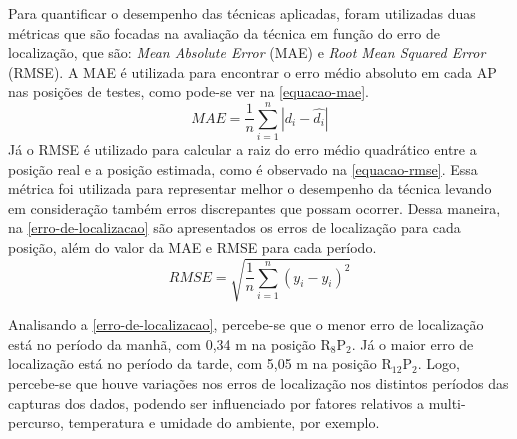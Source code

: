 \documentclass[12pt]{artigoifce}
\begin{document}
\renewcommand{\figureautorefname}{Figura}%
\newpage
Para quantificar o desempenho das técnicas aplicadas, foram utilizadas duas métricas que são focadas na avaliação da técnica em função do erro de localização, que são: \textit{Mean Absolute Error} (MAE) e \textit{Root Mean Squared Error} (RMSE). A MAE é utilizada para encontrar o erro médio absoluto em cada AP nas posições de testes, como pode-se ver na \autoref{equacao-mae}. 
\begin{equation}
	\label{equacao-mae}
	MAE = \frac{1}{n}\sum_{i=1}^{n} \left|d_i-\hat{d_i}\right|
\end{equation}
Já o RMSE é utilizado para calcular a raiz do  erro  médio quadrático entre a posição real e a posição estimada, como é observado na \autoref{equacao-rmse}. Essa métrica foi utilizada para representar melhor o desempenho da técnica levando em consideração também erros discrepantes que possam ocorrer. Dessa maneira, na \autoref{erro-de-localizacao} são apresentados os erros de localização para cada posição, além do valor da MAE e RMSE para cada período.
\begin{equation}
	\label{equacao-rmse}
	RMSE = \sqrt{\frac{1}{n}\sum_{i=1}^{n} \left(y_i-\hat{y_i}\right)^2}
\end{equation}

Analisando a \autoref{erro-de-localizacao}, percebe-se que o menor erro de localização está no período da manhã, com 0,34 m na posição R$_\text{8}$P$_\text{2}$. Já o maior erro de localização está no período da tarde, com 5,05 m na posição R$_\text{12}$P$_\text{2}$. Logo, percebe-se que houve variações nos erros de localização nos distintos períodos das capturas dos dados, podendo ser influenciado por fatores relativos a multi-percurso, temperatura e umidade do ambiente, por exemplo.
\end{document}
